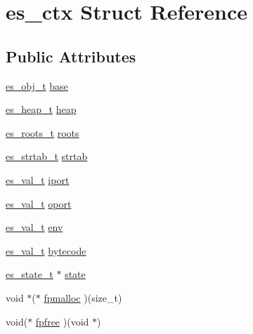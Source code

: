 \hypertarget{structes__ctx}{\section{es\-\_\-ctx Struct Reference}
\label{structes__ctx}
}
\subsection*{Public Attributes}
\begin{DoxyCompactItemize}
\item 
\hyperlink{eva_8h_a3370a89a85f5ff467ca5e7dba47e63bc}{es\-\_\-obj\-\_\-t} \hyperlink{structes__ctx_a7c6a94ab6ea5dadd27f4fc84ba847e87}{base}
\item 
\hyperlink{eva_8c_ab2fe17e4aace907bdbf17cbcd880a6ca}{es\-\_\-heap\-\_\-t} \hyperlink{structes__ctx_a4bda0f41bebf5e45f30ad5acb16630cd}{heap}
\item 
\hyperlink{eva_8c_a5db7c15ce564f6490fb015401c9cb44e}{es\-\_\-roots\-\_\-t} \hyperlink{structes__ctx_a28a5b0f651f7f32bb77cb6b017ecfc5a}{roots}
\item 
\hyperlink{eva_8c_ae44c9593b4a781c948a74bc2dc1e81b5}{es\-\_\-strtab\-\_\-t} \hyperlink{structes__ctx_af20902707356055f32385c19395c1892}{strtab}
\item 
\hyperlink{eva_8h_a31286b308f3660f383b567314be88045}{es\-\_\-val\-\_\-t} \hyperlink{structes__ctx_a0a5e82922de3d23cdfe1bd9cc9a04f44}{iport}
\item 
\hyperlink{eva_8h_a31286b308f3660f383b567314be88045}{es\-\_\-val\-\_\-t} \hyperlink{structes__ctx_ab6d272d37e3f64bb7b7c69b273636993}{oport}
\item 
\hyperlink{eva_8h_a31286b308f3660f383b567314be88045}{es\-\_\-val\-\_\-t} \hyperlink{structes__ctx_afd1fe385c8d9b267c4483864207fceda}{env}
\item 
\hyperlink{eva_8h_a31286b308f3660f383b567314be88045}{es\-\_\-val\-\_\-t} \hyperlink{structes__ctx_a6f40261429125bdbd3dd1ccb1f992483}{bytecode}
\item 
\hyperlink{eva_8c_a83517f93eef8a6be1131bf57a49d59a9}{es\-\_\-state\-\_\-t} $\ast$ \hyperlink{structes__ctx_a15e682b2a1451b0337f2fbf87d0c3682}{state}
\item 
void $\ast$($\ast$ \hyperlink{structes__ctx_ab786126e6ff37f7c6616d81227f4c417}{fpmalloc} )(size\-\_\-t)
\item 
void($\ast$ \hyperlink{structes__ctx_a927cbaa1ca533daaa238c3a5ebfb5ede}{fpfree} )(void $\ast$)
\end{DoxyCompactItemize}


